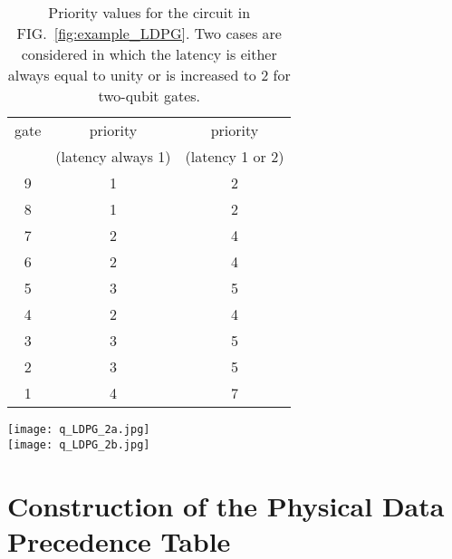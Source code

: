 \documentclass[%
onecolumn,pra,
superscriptaddress,
nofootinbib,
 amsmath,amssymb,
 aps,
11pt,
]{revtex4-1}
\begin{document}
\begin{table}[ht]
\begin{minipage}[b]{0.45\linewidth}
\centering
\begin{tabular}{ | c || c | c |}
\hline
    \hspace{4mm}gate\hspace{4mm} &      priority      &     priority     \\
                                 & (latency always 1) & (latency 1 or 2) \\
\hline \hline
    9 & 1 & 2 \\ \hline
    8 & 1 & 2 \\ \hline
    7 & 2 & 4 \\ \hline
    6 & 2 & 4 \\ \hline
    5 & 3 & 5 \\ \hline
    4 & 2 & 4 \\ \hline
    3 & 3 & 5 \\ \hline
    2 & 3 & 5 \\ \hline
    1 & 4 & 7 \\
\hline
\end{tabular}
\vspace{0.3cm}
\caption{Priority values for the circuit in FIG.~\ref{fig:example_LDPG}. Two cases are considered in which the latency is either always equal to unity or is increased to 2 for two-qubit gates.}
\label{table:example_priority}
\end{minipage}\hfill
%
\begin{minipage}[b]{0.5\linewidth}
\centering
\texttt{[image: q\_LDPG\_2a.jpg]}\\
\vspace{0.4cm}
\texttt{[image: q\_LDPG\_2b.jpg]}
\label{fig:example_priority}
\end{minipage}
\end{table}



\section{Construction of the Physical Data Precedence Table}
\label{sec:PDPT}
\end{document}

